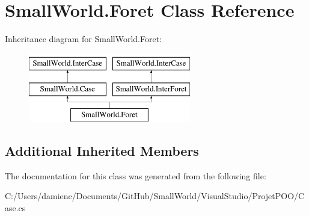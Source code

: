\hypertarget{class_small_world_1_1_foret}{\section{Small\-World.\-Foret Class Reference}
\label{class_small_world_1_1_foret}
}
Inheritance diagram for Small\-World.\-Foret\-:\begin{figure}[H]
\begin{center}
\leavevmode
\includegraphics[height=3.000000cm]{class_small_world_1_1_foret}
\end{center}
\end{figure}
\subsection*{Additional Inherited Members}


The documentation for this class was generated from the following file\-:\begin{DoxyCompactItemize}
\item 
C\-:/\-Users/damienc/\-Documents/\-Git\-Hub/\-Small\-World/\-Visual\-Studio/\-Projet\-P\-O\-O/Case.\-cs\end{DoxyCompactItemize}
